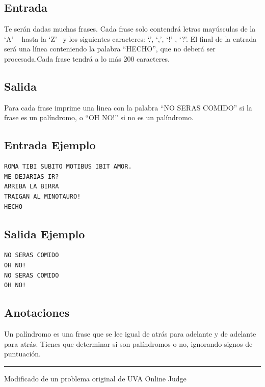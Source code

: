 \documentclass[letter,10pt]{article}
\newcommand{\lyxaddress}[1]{
\par {\raggedright #1
\vspace{1.4em}
\noindent\par}
}
\begin{document}
\subsection*{Entrada}

Te serán dadas muchas frases. Cada frase solo contendrá letras mayúsculas de la `A' ~ hasta la `Z' ~y los siguientes caracteres: `.', `,', `!' , `?'. El final de la entrada será una línea conteniendo la palabra ``HECHO'', que no deberá ser procesada.Cada frase tendrá a lo más 200 caracteres.

\subsection*{Salida}

Para cada frase imprime una linea con la palabra ``NO SERAS COMIDO'' si la frase es un palíndromo, o ``OH NO!'' si no es un palíndromo.

\subsection*{Entrada Ejemplo}

\begin{verbatim}
ROMA TIBI SUBITO MOTIBUS IBIT AMOR.
ME DEJARIAS IR?
ARRIBA LA BIRRA
TRAIGAN AL MINOTAURO!
HECHO
\end{verbatim}

\subsection*{Salida Ejemplo}

\begin{verbatim}
NO SERAS COMIDO
OH NO!
NO SERAS COMIDO
OH NO!
\end{verbatim}

\subsection*{Anotaciones}

Un palíndromo es una frase que se lee igual de atrás para adelante y de adelante para atrás.
Tienes que determinar si son palíndromos o no, ignorando signos de puntuación. 

\noindent \rule[0.5ex]{1\columnwidth}{1pt}


\lyxaddress{Modificado de un problema original de UVA Online Judge}
\end{document}
